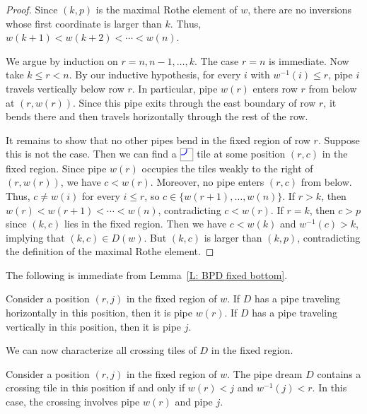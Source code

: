 \documentclass[10pt]{article}
\begin{document}
\begin{proof}
Since $(k,p)$ is the maximal Rothe element of $w$,
there are no inversions whose first coordinate is larger than $k$.
Thus,
$w(k+1)<w(k+2)<\cdots<w(n)$.

We argue by induction on $r=n,n-1,\ldots,k$.
The case $r=n$ is immediate.
Now take $k\leq r<n$.
By our inductive hypothesis, 
for every $i$ with $w^{-1}(i)\leq r$,
pipe $i$ travels vertically below row $r$.
In particular, pipe $w(r)$ enters row $r$
from below at $(r,w(r))$.
Since this pipe exits through the east boundary of row $r$,
it bends there and then travels horizontally
through the rest of the row.

It remains to show that no other pipes bend in the fixed region of row $r$.
Suppose this is not the case. 
Then we can find a $\JTILE$ tile at some position $(r,c)$ in the fixed region.
Since pipe $w(r)$ occupies the tiles weakly to the
right of $(r,w(r))$, we have $c<w(r)$.
Moreover, no pipe enters $(r,c)$ from below.
Thus, $c\neq w(i)$ for every $i\leq r$,
so $c\in\{w(r+1),\ldots,w(n)\}$.
If $r>k$, then
$w(r)<w(r+1)<\cdots<w(n)$,
contradicting $c<w(r)$.
If $r=k$, then $c>p$ since $(k,c)$ lies in the fixed region.
Then we have $c<w(k)$ and $w^{-1}(c)>k$,
implying that $(k,c)\in D(w)$.
But $(k,c)$ is larger than $(k,p)$, contradicting 
the definition of the maximal Rothe element. 
\end{proof}

The following is immediate from
Lemma~\ref{L: BPD fixed bottom}.

\begin{corollary}
\label{C: fixed regions description}
Consider a position $(r,j)$ in the fixed region of $w$.
If $D$ has a pipe traveling horizontally in this position, then 
it is pipe $w(r)$.
If $D$ has a pipe traveling vertically in this position,
then it is pipe $j$.
\end{corollary}


We can now characterize all crossing tiles of $D$ 
in the fixed region.

\begin{corollary}
\label{C: BPD crossing fixed region}
Consider a position $(r,j)$ in the fixed region of $w$.
The pipe dream $D$ contains a crossing tile in this position if and only if
$w(r)<j$ and $w^{-1}(j)<r$.
In this case, the crossing involves
pipe $w(r)$ and pipe $j$.
\end{corollary}
\end{document}

